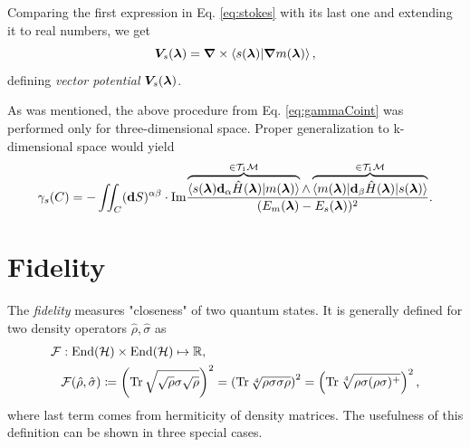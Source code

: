 Comparing the first expression in Eq. \ref{eq:stokes} with its last one and extending it to real numbers, we get
\begin{equation}
    \bm V_s({\bm\lambda})=\bm \nabla\times\braket{s({\bm\lambda})|\bm \nabla m({\bm\lambda})}, 
    \label{eq:vectorPotentialDef}  
\end{equation}
defining \emph{vector potential} $\bm V_s({\bm\lambda})$.

As was mentioned, the above procedure from Eq. \ref{eq:gammaCoint} was performed only for three-dimensional space. Proper generalization to k-dimensional space would yield
\begin{equation}
    \gamma_s(C) = -\iint_C (\bm{\mathrm{d}} S)^{\alpha\beta} \cdot\textrm{Im} \frac{
        \overbrace{\braket{s({\bm\lambda})\bm{\mathrm{d}}_\alpha \hat{H}({\bm\lambda}) |m({\bm\lambda})}}^{\in\mathcal{T}_1\mathcal{M}}\wedge \overbrace{\braket{m({\bm\lambda})|\bm{\mathrm{d}}_\beta\hat{H}({\bm\lambda})|s({\bm\lambda})}}^{\in\mathcal{T}_1\mathcal{M}}    
    }{
        (E_m({\bm\lambda})-E_s({\bm\lambda}))^2
    }.
    \label{eq:mgrads}
\end{equation}
                
                
                



\section{Fidelity}
The \emph{fidelity} measures "closeness" of two quantum states. It is generally defined for two density operators $\hat\rho, \hat\sigma$ as
\begin{equation}
    \begin{split}
        \mathcal F&: \operatorname{End}(\mathcal{H})\times \operatorname{End}(\mathcal{H})\mapsto \mathbb{R}, \\
        &\mathcal F(\hat\rho,\hat\sigma)\coloneqq \left(\operatorname{\textrm{Tr}} \sqrt{\sqrt{\rho}\sigma\sqrt{\rho}}\right)^2 = \left(\operatorname{\textrm{Tr}}\sqrt[4]{\rho \sigma \sigma \rho}\right)^2= \left(\operatorname{\textrm{Tr}}\sqrt[4]{\rho \sigma (\rho\sigma)^+ }\right)^2,
    \end{split}
    \label{eq:fidelitydef}
\end{equation}
where last term comes from hermiticity of density matrices.
The usefulness of this definition can be shown in three special cases.


